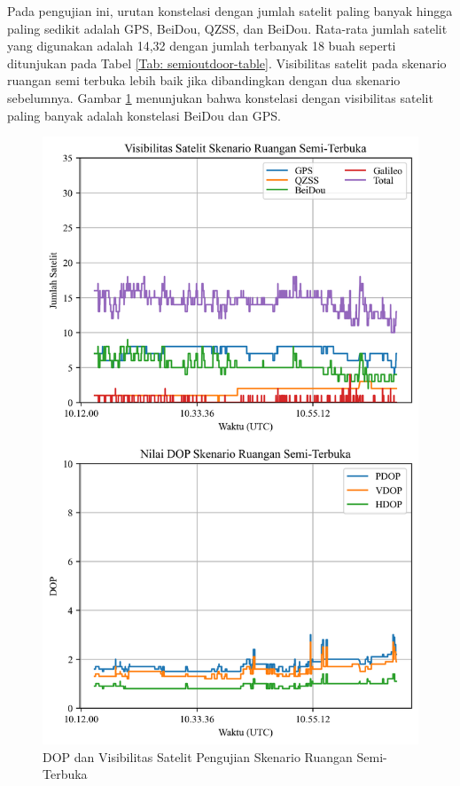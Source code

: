 Pada pengujian ini, urutan konstelasi dengan jumlah satelit paling banyak hingga paling sedikit adalah GPS, BeiDou, QZSS, dan BeiDou. Rata-rata jumlah satelit yang digunakan adalah 14,32 dengan jumlah terbanyak 18 buah seperti ditunjukan pada Tabel \ref{Tab: semioutdoor-table}. Visibilitas satelit pada skenario ruangan semi terbuka lebih baik jika dibandingkan dengan dua skenario sebelumnya. Gambar \ref{Fig: semioutdoor-sats_dop} menunjukan bahwa konstelasi dengan visibilitas satelit paling banyak adalah konstelasi BeiDou dan GPS.

\begin{figure}[H]
	\centering
	\captionsetup{justification=centering}
	\includegraphics[width=11.5cm]{contents/chapter-4/3-skenario-semioutdoor/sats_dop.png}
	\caption{DOP dan Visibilitas Satelit Pengujian Skenario Ruangan Semi-Terbuka}
	\label{Fig: semioutdoor-sats_dop}
\end{figure}

